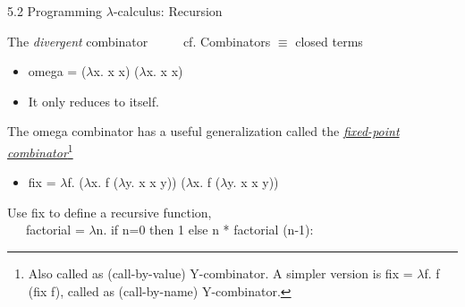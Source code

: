 \documentclass[table]{beamer}
\begin{document}
\begin{frame}[t]{5.2 Programming $\lambda$-calculus: Recursion} \vspace{10pt}

The {\it divergent} combinator  \ \ \ \ \ cf. Combinators $\equiv$ closed terms 
\begin{itemize}
\item omega = ($\lambda$x. x x) ($\lambda$x. x x)
\item It only reduces to itself.
\end{itemize}

\vspace{10pt}

The omega combinator has a useful generalization called the \underline{\it fixed-point combinator}\footnote{Also called as (call-by-value) Y-combinator. A simpler version is fix = $\lambda$f. f (fix f), called as (call-by-name) Y-combinator.}
\begin{itemize}
\item fix = $\lambda$f. ($\lambda$x. f ($\lambda$y. x x y)) ($\lambda$x. f ($\lambda$y. x x y))
\end{itemize}

\vspace{10pt}

Use fix to define a recursive function, \\
 \ \ \ factorial = $\lambda$n. if n=0 then 1 else n * factorial (n-1):

\end{frame}
\end{document}
